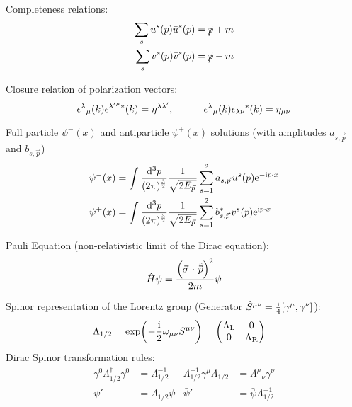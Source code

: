			\noindent
			Completeness relations:
			\begin{equation}
				\begin{aligned}
					\sum_s u^s(p) \bar{u}^s(p) &= \slashed{p} + m \\
					\sum_s v^s(p) \bar{v}^s(p) &= \slashed{p} - m
				\end{aligned}
			\end{equation}

			\noindent
			Closure relation of polarization vectors:
			\begin{equation}
				\epsilon^{\lambda}{}_{\mu}(k)\epsilon^{\lambda^{\prime}{}^{\mu}\ast}(k)=\eta^{\lambda\lambda^{\prime}},
				\hspace{30pt}
				\epsilon^{\lambda}{}_{\mu}(k)\epsilon_{\lambda\nu}{}^{\ast}(k)=\eta_{\mu\nu}
			\end{equation}

			\noindent
			Full particle $\psi^{-}(x)$ and antiparticle $\psi^{+}(x)$ solutions (with amplitudes $a_{s,\vec{p}}$ and $b_{s,\vec{p}}$)
			\begin{equation}
				\begin{aligned}
					\psi^{-}(x) &= \int\frac{\dd^{3}p}{(2\pi)^{\frac{3}{2}}}\frac{1}{\sqrt{2E_{\vec{p}}}}\sum_{s=1}^{2}a_{s, \vec{p}}u^{s}(p)\ex^{-\i p\cdot x} \\
					\psi^{+}(x) &= \int\frac{\dd^{3}p}{(2\pi)^{\frac{3}{2}}}\frac{1}{\sqrt{2E_{\vec{p}}}}\sum_{s=1}^{2}{b_{s, \vec{p}}^{*}}v^{s}(p)\ex^{\i p\cdot x}
				\end{aligned}
			\end{equation}

			\noindent
			Pauli Equation (non-relativistic limit of the Dirac equation):
			\begin{equation}
				\hat{H}\psi = \frac{\qty(\vec{\sigma}\cdot\hat{\vec{p}})^2}{2m} \psi
			\end{equation}

			\noindent
			Spinor representation of the Lorentz group (Generator $\hat{S}^{\mu\nu} = \frac{\mathrm{i}}{4}[\gamma^\mu,\gamma^\nu]$):
			\begin{align}
				\Lambda_{1/2} &= \exp(-\frac{\i}{2}\omega_{\mu\nu}S^{\mu\nu}) = \mqty(\Lambda_\text{L} & 0 \\ 0 & \Lambda_\text{R})
			\end{align}
			Dirac Spinor transformation rules:
			\begin{align}
				\gamma^0 \Lambda_{1/2}^\dagger \gamma^0	&= \Lambda_{1/2}^{-1}
				&
				\Lambda_{1/2}^{-1} \gamma^\mu \Lambda_{1/2} &= \Lambda^\mu{}_\nu \gamma^\nu \\
				\psi' &= \Lambda_{1/2} \psi
				&
				\bar{\psi}' &= \bar{\psi} \Lambda_{1/2}^{-1}
			\end{align}

